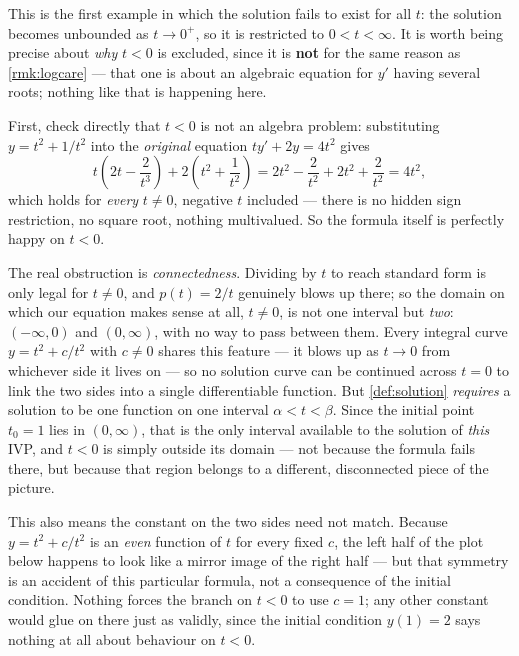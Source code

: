 \begin{remark}\label{rmk:interval-validity}
	This is the first example in which the solution fails to exist for all \(t\): the
	solution becomes unbounded as \(t \to 0^{+}\), so it is restricted to
	\(0 < t < \infty\). It is worth being precise about \emph{why} \(t < 0\) is excluded,
	since it is \textbf{not} for the same reason as \autoref{rmk:logcare} --- that one is
	about an algebraic equation for \(y'\) having several roots; nothing like that is
	happening here.

	First, check directly that \(t < 0\) is not an algebra problem: substituting
	\(y = t^2 + 1/t^2\) into the \emph{original} equation \(ty' + 2y = 4t^2\) gives
	\[
		t\!\left( 2t - \frac{2}{t^3} \right) + 2\left( t^2 + \frac{1}{t^2} \right)
		= 2t^2 - \frac{2}{t^2} + 2t^2 + \frac{2}{t^2} = 4t^2,
	\]
	which holds for \emph{every} \(t \neq 0\), negative \(t\) included --- there is no
	hidden sign restriction, no square root, nothing multivalued. So the formula itself
	is perfectly happy on \(t < 0\).

	The real obstruction is \emph{connectedness}. Dividing by \(t\) to reach standard
	form is only legal for \(t \neq 0\), and \(p(t) = 2/t\) genuinely blows up there; so
	the domain on which our equation makes sense at all, \(t \neq 0\), is not one
	interval but \emph{two}: \((-\infty, 0)\) and \((0, \infty)\), with no way to pass
	between them. Every integral curve \(y = t^2 + c/t^2\) with \(c \neq 0\) shares this
	feature --- it blows up as \(t \to 0\) from whichever side it lives on --- so no
	solution curve can be continued across \(t = 0\) to link the two sides into a single
	differentiable function. But \autoref{def:solution} \emph{requires} a solution to be
	one function on one interval \(\alpha < t < \beta\). Since the initial point
	\(t_0 = 1\) lies in \((0,\infty)\), that is the only interval available to the
	solution of \emph{this} IVP, and \(t < 0\) is simply outside its domain --- not
	because the formula fails there, but because that region belongs to a different,
	disconnected piece of the picture.

	This also means the constant on the two sides need not match. Because
	\(y = t^2 + c/t^2\) is an \emph{even} function of \(t\) for every fixed \(c\), the
	left half of the plot below happens to look like a mirror image of the right half ---
	but that symmetry is an accident of this particular formula, not a consequence of the
	initial condition. Nothing forces the branch on \(t < 0\) to use \(c = 1\); any other
	constant would glue on there just as validly, since the initial condition
	\(y(1) = 2\) says nothing at all about behaviour on \(t < 0\).
\end{remark}

